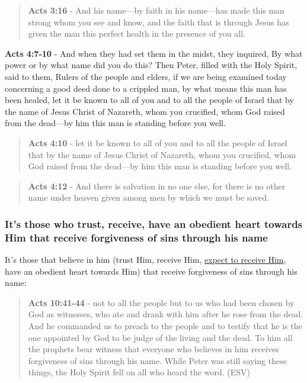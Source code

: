 \documentclass[11pt]{article}
\begin{document}
\begin{quote}
\textbf{Acts 3:16} - And his name—by faith in his name—has made this man strong whom you see and know, and the faith that is through Jesus has given the man this perfect health in the presence of you all.
\end{quote}

\textbf{Acts 4:7-10} - And when they had set them in the midst, they inquired, By what power or by what name did you do this? Then Peter, filled with the Holy Spirit, said to them, Rulers of the people and elders, if we are being examined today concerning a good deed done to a crippled man, by what means this man has been healed, let it be known to all of you and to all the people of Israel that by the name of Jesus Christ of Nazareth, whom you crucified, whom God raised from the dead—by him this man is standing before you well.

\begin{quote}
\textbf{Acts 4:10} - let it be known to all of you and to all the people of Israel that by the name of Jesus Christ of Nazareth, whom you crucified, whom God raised from the dead—by him this man is standing before you well.
\end{quote}

\begin{quote}
\textbf{Acts 4:12} - And there is salvation in no one else, for there is no other name under heaven given among men by which we must be saved.
\end{quote}

\subsubsection{It's those who trust, receive, have an obedient heart towards Him that receive forgiveness of sins through his name}
\label{sec:orge8392ed}

It's those that believe in him (trust Him, receive Him, \uline{expect to receive Him}, have an obedient heart towards Him) that receive forgiveness of sins through his name:

\begin{quote}
\textbf{Acts 10:41-44} - not to all the people but to us who had been chosen by God as witnesses, who ate and drank with him after he rose from the dead. And he commanded us to preach to the people and to testify that he is the one appointed by God to be judge of the living and the dead. To him all the prophets bear witness that everyone who believes in him receives forgiveness of sins through his name. While Peter was still saying these things, the Holy Spirit fell on all who heard the word. (ESV)
\end{quote}
\end{document}
